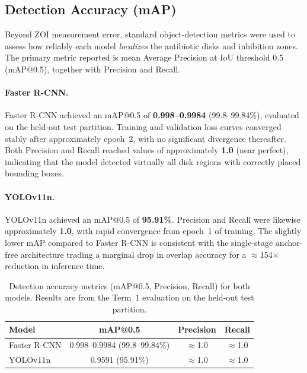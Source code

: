 \subsection{Detection Accuracy (mAP)}
\label{subsec:map_accuracy}

Beyond ZOI measurement error, standard object-detection metrics were used to assess
how reliably each model \emph{localizes} the antibiotic disks and inhibition zones.
The primary metric reported is mean Average Precision at IoU threshold 0.5 (mAP@0.5),
together with Precision and Recall.

\paragraph{Faster R-CNN.}
Faster R-CNN achieved an mAP@0.5 of \textbf{0.998--0.9984} (99.8--99.84\%),
evaluated on the held-out test partition.
Training and validation loss curves converged stably after approximately epoch~2,
with no significant divergence thereafter.
Both Precision and Recall reached values of approximately \textbf{1.0} (near perfect),
indicating that the model detected virtually all disk regions with correctly placed bounding boxes.

\paragraph{YOLOv11n.}
YOLOv11n achieved an mAP@0.5 of \textbf{95.91\%}.
Precision and Recall were likewise approximately \textbf{1.0}, with rapid convergence
from epoch~1 of training.
The slightly lower mAP compared to Faster R-CNN is consistent with the single-stage
anchor-free architecture trading a marginal drop in overlap accuracy
for a $\approx$154$\times$ reduction in inference time.

\begin{table}[H]
  \centering
  \caption{Detection accuracy metrics (mAP@0.5, Precision, Recall) for both models.
           Results are from the Term~1 evaluation on the held-out test partition.}
  \label{tab:map_metrics}
  \begin{tabular}{lccc}
    \toprule
    \textbf{Model} & \textbf{mAP@0.5} & \textbf{Precision} & \textbf{Recall} \\
    \midrule
    Faster R-CNN & 0.998--0.9984 (99.8--99.84\%) & $\approx$1.0 & $\approx$1.0 \\
    YOLOv11n     & 0.9591 (95.91\%)               & $\approx$1.0 & $\approx$1.0 \\
    \bottomrule
  \end{tabular}
\end{table}

